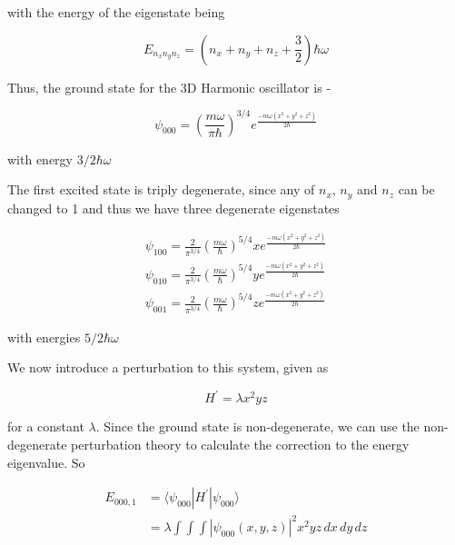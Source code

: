     with the energy of the eigenstate being

    \begin{equation*}
        E_{n_xn_yn_z} = \left( n_x + n_y + n_z + \frac{3}{2} \right) \hbar\omega
    \end{equation*}

    Thus, the ground state for the 3D Harmonic oscillator is - 

    \begin{equation*}
        \psi_{000} = \left( \frac{m\omega}{\pi\hbar} \right)^{3/4} e^{\frac{-m\omega (x^2 + y^2 + z^2)}{2\hbar}}
    \end{equation*}

    with energy $3/2 \hbar\omega$

    The first excited state is triply degenerate, since any of $n_x$, $n_y$ and $n_z$ can be changed to 1 and thus we have three degenerate eigenstates

    \begin{gather*}
        \psi_{100} = \frac{2}{\pi^{3/4}} \left( \frac{m\omega}{\hbar} \right)^{5/4} x e^{\frac{-m\omega (x^2 + y^2 + z^2)}{2\hbar}} \\
        \psi_{010} = \frac{2}{\pi^{3/4}} \left( \frac{m\omega}{\hbar} \right)^{5/4} y e^{\frac{-m\omega (x^2 + y^2 + z^2)}{2\hbar}} \\
        \psi_{001} = \frac{2}{\pi^{3/4}} \left( \frac{m\omega}{\hbar} \right)^{5/4} z e^{\frac{-m\omega (x^2 + y^2 + z^2)}{2\hbar}} 
    \end{gather*}

    with energies $5/2 \hbar\omega$

    We now introduce a perturbation to this system, given as

    \begin{equation*}
        H^{'} = \lambda x^2yz
    \end{equation*}

    for a constant $\lambda$. Since the ground state is non-degenerate, we can use the non-degenerate perturbation theory to calculate the correction to the energy eigenvalue. So

    \begin{equation*}
        \begin{split}
            E_{000,1} & = \langle \psi_{000} | H^{'} | \psi_{000} \rangle \\
            & = \lambda \int \int \int |\psi_{000}(x,y,z)|^2 x^2yz \, dx \, dy \, dz
        \end{split}
    \end{equation*}

